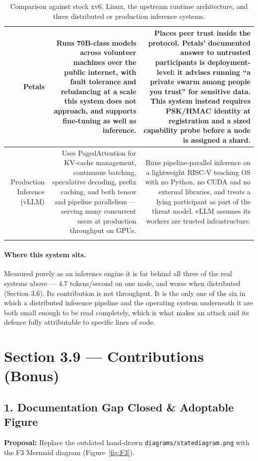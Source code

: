 \documentclass[11pt]{article}
\renewcommand{\_}{\origunderscore\allowbreak}
\begin{document}
\begin{longtable}{@{}R{0.18}R{0.41}R{0.41}@{}}
\midrule
Petals &
Runs 70B-class models across volunteer machines over the public internet, with fault tolerance and rebalancing at a scale this system does not approach, and supports fine-tuning as well as inference. &
Places peer trust inside the protocol. Petals' documented answer to untrusted participants is deployment-level: it advises running ``a private swarm among people you trust'' for sensitive data. This system instead requires PSK/HMAC identity at registration and a sized capability probe before a node is assigned a shard. \\
\midrule
Production Inference (vLLM) &
Uses PagedAttention for KV-cache management, continuous batching, speculative decoding, prefix caching, and both tensor and pipeline parallelism --- serving many concurrent users at production throughput on GPUs. &
Runs pipeline-parallel inference on a lightweight RISC-V teaching OS with no Python, no CUDA and no external libraries, and treats a lying participant as part of the threat model. vLLM assumes its workers are trusted infrastructure. \\
\bottomrule
\caption{Comparison against stock xv6, Linux, the upstream runtime architecture, and three distributed or production inference systems.}
\label{tab:related-systems}
\end{longtable}
\endgroup

\paragraph{Where this system sits.}
Measured purely as an inference engine it is far behind all three of the real systems above --- 4.7 tokens/second on one node, and worse when distributed (Section 3.6). Its contribution is not throughput. It is the only one of the six in which a distributed inference pipeline and the operating system underneath it are both small enough to be read completely, which is what makes an attack and its defence fully attributable to specific lines of code.

\section*{Section 3.9 --- Contributions (Bonus)}

\subsection*{1. Documentation Gap Closed \& Adoptable Figure}
\textbf{Proposal:} Replace the outdated hand-drawn \texttt{diagrams/state\_diagram.png} with the F3 Mermaid diagram (Figure~\ref{fig:F3}).
\end{document}
